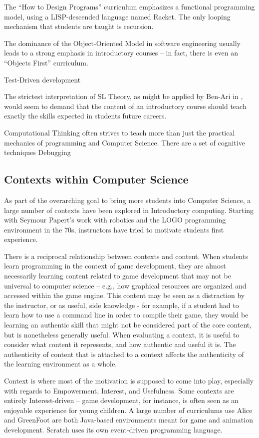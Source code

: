 The ``How to Design Programs'' curriculum emphasizes a functional programming model, using a LISP-descended language named Racket.
The only looping mechanism that students are taught is recursion.

The dominance of the Object-Oriented Model in software engineering usually leads to a strong emphasis in introductory courses -- in fact, there is even an ``Objects First'' curriculum.

Test-Driven development

The strictest interpretation of SL Theory, as might be applied by Ben-Ari in \cite{ben2004situated}, would seem to demand that the content of an introductory course should teach exactly the skills expected in students future careers. 

Computational Thinking often strives to teach more than just the practical mechanics of programming and Computer Science.
There are a set of cognitive techniques
Debugging

\subsection{Contexts within Computer Science}

As part of the overarching goal to bring more students into Computer Science, a large number of contexts have been explored in Introductory computing. 
Starting with Seymour Papert's work with robotics and the LOGO programming environment in the 70s, instructors have tried to motivate students first experience. %

There is a reciprocal relationship between contexts and content.
When students learn programming in the context of game development, they are almost necessarily learning content related to game development that may not be universal to computer science -- e.g., how graphical resources are organized and accessed within the game engine.
This content may be seen as a distraction by the instructor, or as useful, side knowledge - for example, if a student had to learn how to use a command line in order to compile their game, they would be learning an authentic skill that might not be considered part of the core content, but is nonetheless generally useful.
When evaluating a context, it is useful to consider what content it represents, and how authentic and useful it is.
The authenticity of content that is attached to a context affects the authenticity of the learning environment as a whole.

Context is where most of the motivation is supposed to come into play, especially with regards to Empowerment, Interest, and Usefulness.
Some contexts are entirely Interest-driven -- game development, for instance, is often seen as an enjoyable experience for young children.
A large number of curriculums use 
Alice and GreenFoot are both Java-based environments meant for game and animation development.
Scratch uses its own event-driven programming language.


